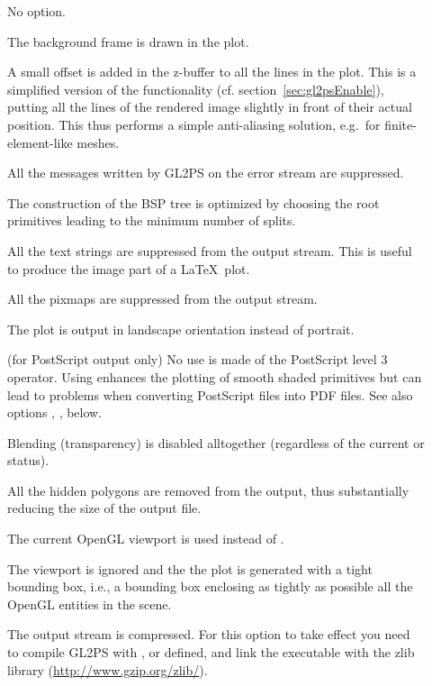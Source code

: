 \begin{description}
\begin{description}
\item[] No option.
\item[] The background frame is drawn in the
  plot.
\item[] A small offset is added in the z-buffer
  to all the lines in the plot. This is a simplified version of the
   functionality
  (cf. section~\ref{sec:gl2psEnable}), putting all the lines of the rendered
  image slightly in front of their actual position. This thus performs a
  simple anti-aliasing solution, e.g.\ for finite-element-like meshes.
\item[] All the messages written by GL2PS on the error
  stream are suppressed.
\item[] The construction of the BSP tree is optimized by
  choosing the root primitives leading to the minimum number of splits.
\item[] All the text strings are suppressed from
  the output stream. This is useful to produce the image part of a \LaTeX\ plot.
\item[] All the pixmaps are suppressed from the output
  stream.
\item[] The plot is output in landscape orientation
  instead of portrait.
\item[] (for PostScript output only) No use is made
  of the  PostScript level 3 operator. Using  enhances
  the plotting of smooth shaded primitives but can lead to problems when
  converting PostScript files into PDF files. See also options ,
  ,  below.
\item[] Blending (transparency) is disabled
  alltogether (regardless of the current  or 
  status).
\item[] All the hidden polygons are removed from
  the output, thus substantially reducing the size of the output file.
\item[] The current OpenGL viewport is used
  instead of .
\item[] The viewport is ignored and the
  the plot is generated with a tight bounding box, i.e., a bounding
  box enclosing as tightly as possible all the OpenGL entities in the
  scene.
\item[] The output stream is compressed. For this option
  to take effect you need to compile GL2PS with ,
   or  defined, and link the executable
  with the zlib library (\url{http://www.gzip.org/zlib/}).


\end{description}
\end{description}
